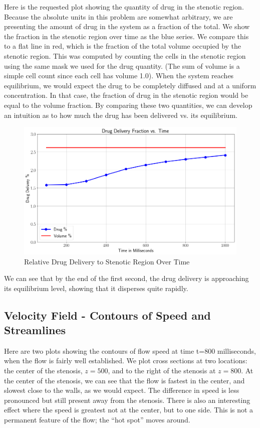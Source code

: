 \documentclass[11pt]{article} %
\begin{document}
Here is the requested plot showing the quantity of drug in the stenotic region.
Because the absolute units in this problem are somewhat arbitrary,
we are presenting the amount of drug in the system as a fraction of the total.
We show the fraction in the stenotic region over time as the blue series.
We compare this to a flat line in red, which is the fraction of the total volume
occupied by the stenotic region.  
This was computed by counting the cells in the stenotic region using the same
mask we used for the drug quantity.  
(The sum of volume is a simple cell count since each cell has volume 1.0).
When the system reaches equilibrium, we would expect the drug to be completely
diffused and at a uniform concentration.  
In that case, the fraction of drug in the stenotic region would be equal to the volume fraction.  
By comparing these two quantities, we can develop an intuition as to how much 
the drug has been delivered vs. its equilibrium.
\begin{figure}[h!]
\centering
\includegraphics[width=1.00\textwidth]{drug_frac.png}
\caption{Relative Drug Delivery to Stenotic Region Over Time}
\end{figure}
We can see that by the end of the first second, the drug delivery
is approaching its equilibrium level, showing that it disperses quite rapidly.

\subsection{Velocity Field - Contours of Speed and Streamlines}
Here are two plots showing the contours of flow speed at time t=800 milliseconds, 
when the flow is fairly well established.  
We plot cross sections at two locations: 
the center of the stenosis, $z=500$,
and to the right of the stenosis at $z=800$.
At the center of the stenosis, we can see that the flow is fastest in the center, and slowest close to the walls, as we would expect.
The difference in speed is less pronounced but still present away from the stenosis.
There is also an interesting effect where the speed is greatest not at the center, but to one side.
This is not a permanent feature of the flow; the ``hot spot'' moves around.
\end{document}
